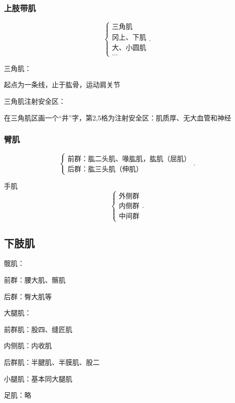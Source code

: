 \subsubsection{上肢带肌}%
\label{subsub:上肢带肌}
\[
    \begin{cases}
        \text{三角肌}\\
        \text{冈上、下肌}\\
        \text{大、小圆肌}\\
        \ldots
    \end{cases}
.\] 
\begin{notation}
    三角肌：

    起点为一条线，止于肱骨，运动肩关节

    三角肌注射安全区：

    在三角肌区画一个“井”字，第2,5格为注射安全区：肌质厚、无大血管和神经
\end{notation}
\subsubsection{臂肌}%
\label{subsub:臂肌}
\[
    \begin{cases}
        \text{前群：肱二头肌、喙肱肌，肱肌（屈肌）}\\
        \text{后群：肱三头肌（伸肌）}
    \end{cases}
.\] 
\begin{notation}
    手肌
    \[
        \begin{cases}
            \text{外侧群}\\
            \text{内侧群}\\
            \text{中间群}
        \end{cases}
    .\]     
\end{notation}
\subsection{下肢肌}%
\label{sub:下肢肌}
\begin{notation}
    髋肌：

    前群：腰大肌、髂肌

    后群：臀大肌等
\end{notation}
\begin{notation}
    大腿肌：

    前群肌：股四、缝匠肌

    内侧肌：内收肌

    后群肌：半腱肌、半膜肌、股二
\end{notation}
\begin{notation}
    小腿肌：基本同大腿肌
\end{notation}
\begin{notation}
    足肌：略
\end{notation}



